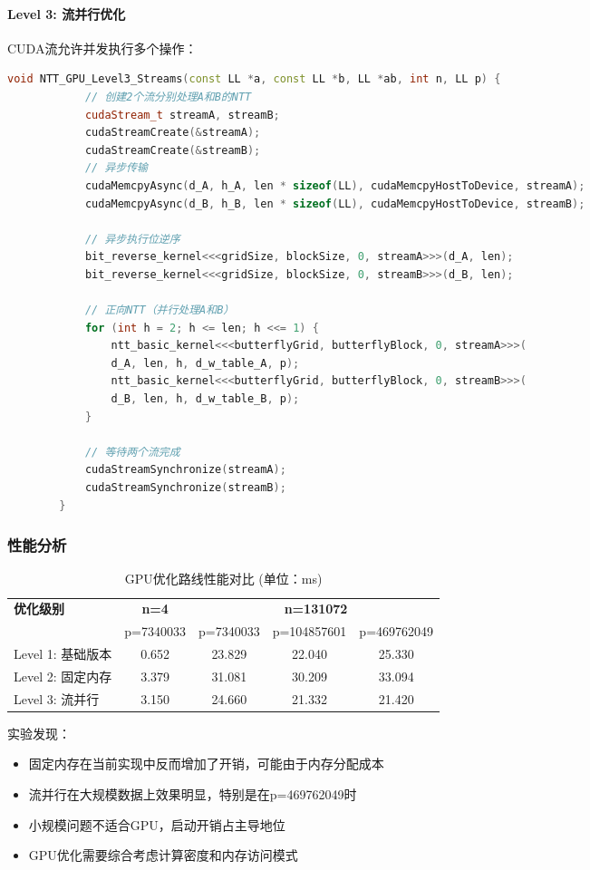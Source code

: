 \documentclass[a4paper]{article}
\begin{document}
	\paragraph{Level 3: 流并行优化}
	CUDA流允许并发执行多个操作：
	\begin{lstlisting}[language=C++, caption=流并行实现]
		void NTT_GPU_Level3_Streams(const LL *a, const LL *b, LL *ab, int n, LL p) {
			// 创建2个流分别处理A和B的NTT
			cudaStream_t streamA, streamB;
			cudaStreamCreate(&streamA);
			cudaStreamCreate(&streamB);
			// 异步传输
			cudaMemcpyAsync(d_A, h_A, len * sizeof(LL), cudaMemcpyHostToDevice, streamA);
			cudaMemcpyAsync(d_B, h_B, len * sizeof(LL), cudaMemcpyHostToDevice, streamB);
			
			// 异步执行位逆序
			bit_reverse_kernel<<<gridSize, blockSize, 0, streamA>>>(d_A, len);
			bit_reverse_kernel<<<gridSize, blockSize, 0, streamB>>>(d_B, len);
			
			// 正向NTT（并行处理A和B）
			for (int h = 2; h <= len; h <<= 1) {
				ntt_basic_kernel<<<butterflyGrid, butterflyBlock, 0, streamA>>>(
				d_A, len, h, d_w_table_A, p);
				ntt_basic_kernel<<<butterflyGrid, butterflyBlock, 0, streamB>>>(
				d_B, len, h, d_w_table_B, p);
			}
			
			// 等待两个流完成
			cudaStreamSynchronize(streamA);
			cudaStreamSynchronize(streamB);
		}
	\end{lstlisting}
	
	\subsubsection{性能分析}
	\begin{table}[H]
		\centering
		\caption{GPU优化路线性能对比 (单位：ms)}
		\begin{tabular}{|l|c|c|c|c|}
			\hline
			\textbf{优化级别} & \textbf{n=4} & \multicolumn{3}{c|}{\textbf{n=131072}} \\
			\cline{3-5}
			& p=7340033 & p=7340033 & p=104857601 & p=469762049 \\
			\hline
			Level 1: 基础版本 & 0.652 & 23.829 & 22.040 & 25.330 \\
			\hline
			Level 2: 固定内存 & 3.379 & 31.081 & 30.209 & 33.094 \\
			\hline
			Level 3: 流并行 & 3.150 & 24.660 & 21.332 & 21.420 \\
			\hline
		\end{tabular}
	\end{table}
	实验发现：
	\begin{itemize}
		\item 固定内存在当前实现中反而增加了开销，可能由于内存分配成本
		\item 流并行在大规模数据上效果明显，特别是在p=469762049时
		\item 小规模问题不适合GPU，启动开销占主导地位
		\item GPU优化需要综合考虑计算密度和内存访问模式
	\end{itemize}
\end{document}
